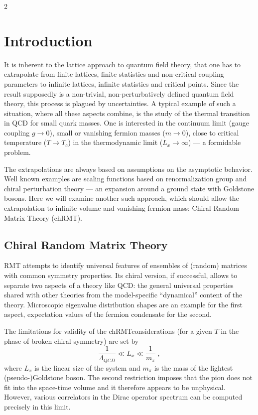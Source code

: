 \begin{multicols}{2}
\narrowtext

\section{Introduction} 

It is inherent to the lattice approach to quantum field theory, that one has to
extrapolate from finite lattices, finite statistics and non-critical coupling
parameters to infinite lattices, infinite statistics and critical points. Since
the result supposedly is a non-trivial, non-perturbatively defined quantum
field theory, this process is plagued by uncertainties. A typical example of
such a situation, where all these aspects combine, is the study of the thermal
transition in QCD for small quark masses.  One is interested in the continuum
limit (gauge coupling $g\to 0$), small or vanishing fermion masses ($m\to 0$),
close to critical temperature ($T\to T_c$) in the thermodynamic limit ($L_x\to
\infty$) --- a formidable problem.

The extrapolations are always based on assumptions on the asymptotic 
behavior.  Well known examples are scaling functions based on renormalization
group and chiral perturbation theory --- an expansion around a ground state
with  Goldstone bosons. Here we will examine another such approach, which
should allow the extrapolation to infinite volume and vanishing fermion mass:
Chiral Random Matrix Theory (chRMT). 

\subsection{Chiral Random Matrix Theory}

RMT attempts to identify universal features of ensembles of (random) matrices
with common symmetry properties. Its chiral version, if successful, allows to
separate two aspects of a theory like QCD: the general universal properties
shared with other theories from the model-specific ``dynamical'' content of the
theory. Microscopic eigenvalue distribution shapes are an example for the first
aspect,  expectation values of the fermion condensate for the second.

The limitations for validity of the chRMT\space  considerations (for a given
$T$ in the phase of broken chiral symmetry) are set by \cite{LeSm92,ShVe93}
\begin{equation}\label{QCDrange}
\frac{1}{\Lambda_{QCD}} \ll L_x \ll \frac{1}{m_\pi} \; ,
\end{equation}
where $L_x$ is the linear size of the system and $m_\pi$ is the mass of the
lightest (pseudo-)Goldstone boson. The second restriction imposes that the pion
does not  fit into the space-time volume and it therefore appears to be
unphysical. However,  various correlators in the Dirac operator spectrum can be
computed precisely in this limit.


\end{multicols}
